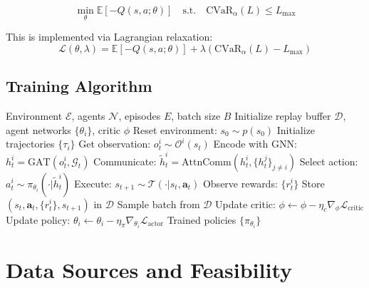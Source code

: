 \documentclass[11pt,a4paper]{article}
\begin{document}
\begin{equation}\label{eq:cvar}
\min_\theta \mathbb{E}\left[ -Q(s,a;\theta) \right] \quad \text{s.t.} \quad \text{CVaR}_\alpha(L) \leq L_{\max}
\end{equation}

This is implemented via Lagrangian relaxation:
\begin{equation}
\mathcal{L}(\theta, \lambda) = \mathbb{E}\left[ -Q(s,a;\theta) \right] + \lambda \left( \text{CVaR}_\alpha(L) - L_{\max} \right)
\end{equation}

\subsection{Training Algorithm}

\begin{algorithm}[H]
\caption{CTDE Training Loop for Cross-Chain DeFi}
\label{alg:training}
\begin{algorithmic}[1]
\Require Environment $\mathcal{E}$, agents $\mathcal{N}$, episodes $E$, batch size $B$
\State Initialize replay buffer $\mathcal{D}$, agent networks $\{\theta_i\}$, critic $\phi$
    \State Reset environment: $s_0 \sim p(s_0)$
    \State Initialize trajectories $\{\tau_i\}$
            \State Get observation: $o_t^i \sim \mathcal{O}^i(s_t)$
            \State Encode with GNN: $h_t^i = \text{GAT}(o_t^i, \mathcal{G}_t)$
            \State Communicate: $\tilde{h}_t^i = \text{AttnComm}(h_t^i, \{h_t^j\}_{j \neq i})$
            \State Select action: $a_t^i \sim \pi_{\theta_i}(\cdot | \tilde{h}_t^i)$
        \EndFor
        \State Execute: $s_{t+1} \sim \mathcal{T}(\cdot | s_t, \mathbf{a}_t)$
        \State Observe rewards: $\{r_t^i\}$
        \State Store $(s_t, \mathbf{a}_t, \{r_t^i\}, s_{t+1})$ in $\mathcal{D}$
    \EndFor
        \State Sample batch from $\mathcal{D}$
        \State Update critic: $\phi \leftarrow \phi - \eta_c \nabla_\phi \mathcal{L}_{\text{critic}}$
            \State Update policy: $\theta_i \leftarrow \theta_i - \eta_\pi \nabla_{\theta_i} \mathcal{L}_{\text{actor}}$
        \EndFor
    \EndIf
\EndFor
\State \Return Trained policies $\{\pi_{\theta_i}\}$
\end{algorithmic}
\end{algorithm}

\section{Data Sources and Feasibility}\label{sec:data}
\end{document}
